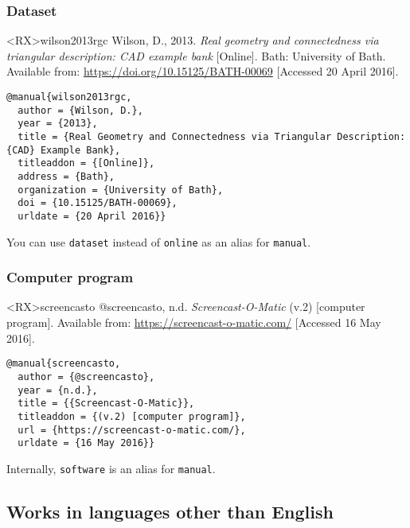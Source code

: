 \documentclass[10pt,a4paper]{article}
\newenvironment{info}{%
  \begin{list}{\makebox[2em][c]{\faInfoCircle}}{%
    \setlength{\leftmargin}{2em}
    \setlength{\labelwidth}{2em}
    \setlength{\labelsep}{0pt}}
}{\end{list}}
\begin{document}
\subsubsection*{Dataset}

\begin{bibexbox}<RX>{wilson2013rgc}
  Wilson, D., 2013. \emph{Real geometry and connectedness via triangular description: CAD example bank} [Online]. Bath: University of Bath. Available from: \url{https://doi.org/10.15125/BATH-00069} [Accessed 20 April 2016].
  \tcblower
\begin{Verbatim}
@manual{wilson2013rgc,
  author = {Wilson, D.},
  year = {2013},
  title = {Real Geometry and Connectedness via Triangular Description: {CAD} Example Bank},
  titleaddon = {[Online]},
  address = {Bath},
  organization = {University of Bath},
  doi = {10.15125/BATH-00069},
  urldate = {20 April 2016}}
\end{Verbatim}
\end{bibexbox}

\begin{info}\item
You can use \texttt{dataset} instead of \texttt{online} as an alias for \texttt{manual}.
\end{info}

\subsubsection*{Computer program}

\begin{bibexbox}<RX>{screencasto}
  @screencasto, n.d. \emph{Screencast-O-Matic} (v.2) [computer program]. Available from: \url{https://screencast-o-matic.com/} [Accessed 16 May 2016].
  \tcblower
\begin{Verbatim}
@manual{screencasto,
  author = {@screencasto},
  year = {n.d.},
  title = {{Screencast-O-Matic}},
  titleaddon = {(v.2) [computer program]},
  url = {https://screencast-o-matic.com/},
  urldate = {16 May 2016}}
\end{Verbatim}
\end{bibexbox}

\begin{info}\item
Internally, \texttt{software} is an alias for \texttt{manual}.
\end{info}

\subsection{Works in languages other than English}
\end{document}
